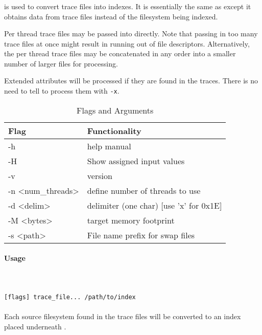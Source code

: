 \subsubsection{\gufitraceindex}
\gufitraceindex is used to convert trace files into indexes. It is
essentially the same as \gufidirindex except it obtains data from
trace files instead of the filesystem being indexed.

Per thread trace files may be passed into \gufitraceindex
directly. Note that passing in too many trace files at once might
result in running out of file descriptors. Alternatively, the per
thread trace files may be concatenated in any order into a smaller
number of larger files for processing.

Extended attributes will be processed if they are found in the traces.
There is no need to tell \gufitraceindex to process them
with \texttt{-x}.

\begin{table} [htb]
  \centering
  \begin{tabular}{l|l}
    Flag & Functionality \\
    \hline
    -h & help manual \\
    \hline
    -H & Show assigned input values \\
    \hline
    -v & version \\
    \hline
    -n \textless num\_threads\textgreater & define number of threads to use \\
    \hline
    -d \textless delim\textgreater & delimiter (one char)  [use 'x' for 0x1E] \\
    \hline
    -M \textless bytes\textgreater & target memory footprint \\
    \hline
    -s \textless path\textgreater & File name prefix for swap files \\
    \hline
  \end{tabular}
  \caption{\label{fig:Flags_for_trace2index} \gufitraceindex Flags and Arguments}
\end{table}

\paragraph{Usage} ~\\\\
\gufitraceindex \texttt{[flags] trace\_file... /path/to/index} \\\\
Each source filesystem found in the trace files will be converted to an index placed underneath \indexroot.
